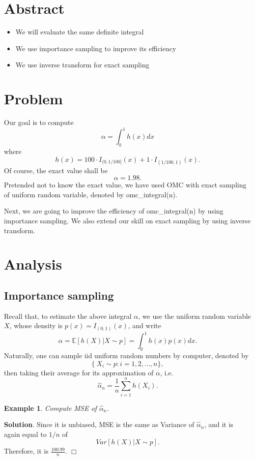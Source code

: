 \documentclass{article}
\newtheorem{example}{Example}
\begin{document}
\section{Abstract}

\begin{itemize}
 \item We will evaluate the same definite integral
 \item We use importance sampling to improve its efficiency
 \item We use inverse transform for exact sampling
\end{itemize}

\section{Problem}
Our goal is to compute
$$\alpha = \int_0^1 h(x) dx$$
where
$$h(x) = 100 \cdot I_{(0, 1/100]}(x) + 1\cdot I_{(1/100, 1)} (x).$$
Of course, the exact value shall be 
$$\alpha = 1.98.$$
Pretended not to know the exact value, we have used OMC with exact sampling of uniform random variable, denoted by omc\_integral(n). 

Next, we are going to improve the efficiency of omc\_integral(n) by using importance sampling. We also extend our skill on exact sampling by using inverse transform.

\section{Analysis}

\subsection{Importance sampling}
Recall that, to estimate the above integral $\alpha$, 
we use the uniform random variable $X$, 
whose density is $p(x) = I_{(0,1)}(x)$, and write
$$\alpha = \mathbb E[h(X) | X \sim p] = \int_{0}^{1} h(x) p(x) dx.$$
Naturally, one can sample iid uniform random numbers by computer, denoted by
$$\{\ X_i \sim p: i = 1, 2, \ldots, n\} ,$$
then taking their average for its approximation of $\alpha$, i.e.
$$\hat \alpha_n = \frac 1 n \sum_{i=1}^n h(X_i).$$

\begin{example}
 Compute MSE of $\hat \alpha_{n}$.
\end{example}
{\bf Solution}.
Since it is unbiased, MSE is the same as Variance of $\hat \alpha_{n}$, 
and it is again equal to $1/n$ of 
$$Var[h(X) | X\sim p].
$$Therefore, it is
$\frac{100.99}{n}$. \hfill $\Box$
\end{document}
